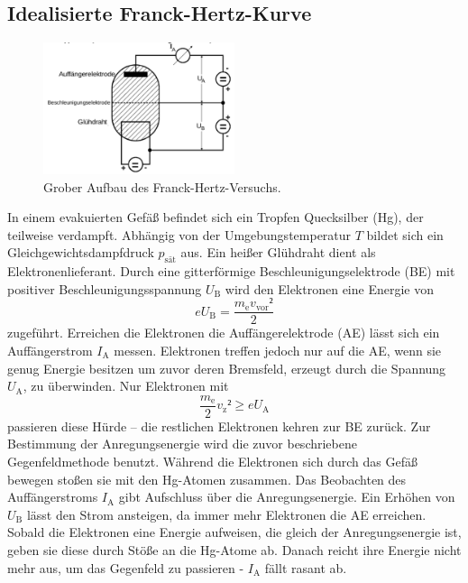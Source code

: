 \subsection{Idealisierte Franck-Hertz-Kurve}
\begin{figure}
	\includegraphics[width=0.5\textwidth]{Bilder/Aufbau.pdf}
	\caption{Grober Aufbau des Franck-Hertz-Versuchs.}
\end{figure}
In einem evakuierten Gefäß befindet sich ein Tropfen Quecksilber (Hg), der teilweise verdampft. 
Abhängig von der Umgebungstemperatur $T$ bildet sich ein Gleichgewichtsdampfdruck $p_\mathup{sät}$ aus. 
Ein heißer Glühdraht dient als Elektronenlieferant.
Durch eine gitterförmige Beschleunigungselektrode (BE) mit positiver Beschleunigungsspannung $U_\mathup{B}$ wird den Elektronen eine Energie von 
\begin{equation}
	e U_\mathup{B}=\frac{m_\mathup{e}v_\mathup{vor}²}{2}
\end{equation}
zugeführt. 
Erreichen die Elektronen die Auffängerelektrode (AE) lässt sich ein Auffängerstrom $I_\mathup{A}$ messen. 
Elektronen treffen jedoch nur auf die AE, wenn sie genug Energie besitzen um zuvor deren Bremsfeld, erzeugt durch die Spannung $U_\mathup{A}$, zu überwinden. 
Nur Elektronen mit 
\begin{equation}
	\frac{m_\mathup{e}}{2}v_\mathup{z}² \geq e U_\mathup{A}
\end{equation}
passieren diese Hürde -- die restlichen Elektronen kehren zur BE zurück.
Zur Bestimmung der Anregungsenergie wird die zuvor beschriebene Gegenfeldmethode benutzt. 
Während die Elektronen sich durch das Gefäß bewegen stoßen sie mit den Hg-Atomen zusammen. 
Das Beobachten des Auffängerstroms $I_\mathup{A}$ gibt Aufschluss über die Anregungsenergie.
Ein Erhöhen von $U_\mathup{B}$ lässt den Strom ansteigen, da immer mehr Elektronen die AE erreichen.
Sobald die Elektronen eine Energie aufweisen, die gleich der Anregungsenergie ist, geben sie diese durch Stöße an die Hg-Atome ab. 
Danach reicht ihre Energie nicht mehr aus, um das Gegenfeld zu passieren - $I_\mathup{A}$ fällt rasant ab.
